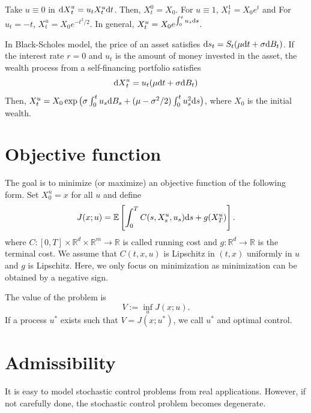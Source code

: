 \documentclass[11pt]{book}
\newcommand{\dd}{\text{\normalfont d}}
\newcommand{\dt}{\text{\normalfont d}t}
\newcommand{\ds}{\text{\normalfont d}s}
\newcommand{\dX}{\text{\normalfont d}X}
\begin{document}
\begin{eg}
	Take $u\equiv0$ in ${\dX}^u_t=u_tX_t^u {{\dt}}$. Then, $X_t^0=X_0$. For $u\equiv 1$, $X_t^1=X_0e^t$ and For $u_t=-t$, $X_t^u=X_0e^{-t^2/2}$. In general, $X_t^u=X_0e^{\int_0^tu_s{{\ds}}}$.
\end{eg}
\begin{eg}\label{eg:wealth}
In Black-Scholes model, the price of an asset satisfies ${{\ds}}_t=S_t(\mu {{\dt}}+\sigma {\dd}B_t)$. If the interest rate $r=0$ and $u_t$ is the amount of money invested in the asset, the wealth process from a self-financing portfolio satisfies
	\begin{equation}
	    {\dX}^u_t=u_t(\mu {{\dt}}+\sigma {\dd}B_t)
	\end{equation} 
 Then, $X_t^u=X_0\exp\big(\sigma\int_0^tu_s{\dd}B_s+(\mu-\sigma^2/2)\int_0^t u^2_s{{\ds}}\big)$, where $X_0$ is the initial wealth.
	\end{eg}
\section{Objective function}
The goal is to  minimize (or maximize) an objective function of the following form. Set $X_0^u=x$ for all $u$ and define
\begin{equation}
J(x;u)=\mathbb{E}\left[\int_0^T C(s,X_s^u,u_s){{\ds}}+g(X_T^u)\right].
\end{equation}
where $C:[0,T]\times\mathbb{R}^d\times\mathbb{R}^m\to\mathbb{R}$ is called running cost and $g:\mathbb{R}^d\to\mathbb{R}$ is the terminal cost. 
We assume that $C(t,x,u)$ is Lipschitz in $(t,x)$ uniformly in $u$ and $g$ is Lipschitz. Here, we only focus on minimization as minimization can be obtained by a negative sign. 


The value of the problem is
\begin{equation}
	V:=\inf_{u}J(x;u).
\end{equation}
If a process $u^*$ exists such that   $V=J(x;u^*)$, we call $u^*$ and optimal control. 

\section{Admissibility}
It is easy to model stochastic control problems from real applications.  However, if not carefully done, the stochastic control problem becomes degenerate.
\end{document}

